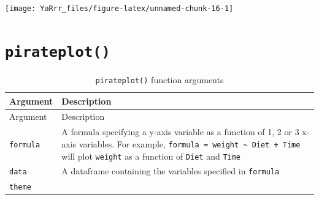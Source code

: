 \documentclass[]{book}
\theoremstyle{definition}
\theoremstyle{definition}
\theoremstyle{remark}
\begin{document}
\begin{center}\texttt{[image: YaRrr\_files/figure-latex/unnamed-chunk-16-1]} \end{center}

\section{\texorpdfstring{\texttt{pirateplot()}}{pirateplot()}}\label{pirateplot}

\begin{longtable}[]{@{}ll@{}}
\caption{\label{tab:pirateplot} \texttt{pirateplot()} function
arguments}\tabularnewline
\toprule
\begin{minipage}[b]{0.18\columnwidth}\raggedright\strut
Argument\strut
\end{minipage} & \begin{minipage}[b]{0.67\columnwidth}\raggedright\strut
Description\strut
\end{minipage}\tabularnewline
\midrule
\endfirsthead
\toprule
\begin{minipage}[b]{0.18\columnwidth}\raggedright\strut
Argument\strut
\end{minipage} & \begin{minipage}[b]{0.67\columnwidth}\raggedright\strut
Description\strut
\end{minipage}\tabularnewline
\midrule
\endhead
\begin{minipage}[t]{0.18\columnwidth}\raggedright\strut
\texttt{formula}\strut
\end{minipage} & \begin{minipage}[t]{0.67\columnwidth}\raggedright\strut
A formula specifying a y-axis variable as a function of 1, 2 or 3 x-axis
variables. For example,
\texttt{formula\ =\ weight\ \textasciitilde{}\ Diet\ +\ Time} will plot
\texttt{weight} as a function of \texttt{Diet} and \texttt{Time}\strut
\end{minipage}\tabularnewline
\begin{minipage}[t]{0.18\columnwidth}\raggedright\strut
\texttt{data}\strut
\end{minipage} & \begin{minipage}[t]{0.67\columnwidth}\raggedright\strut
A dataframe containing the variables specified in \texttt{formula}\strut
\end{minipage}\tabularnewline
\begin{minipage}[t]{0.18\columnwidth}\raggedright\strut
\texttt{theme}\strut
\end{minipage} & \begin{minipage}[t]{0.67\columnwidth}\raggedright\strut

\end{minipage}
\end{longtable}
\end{document}
